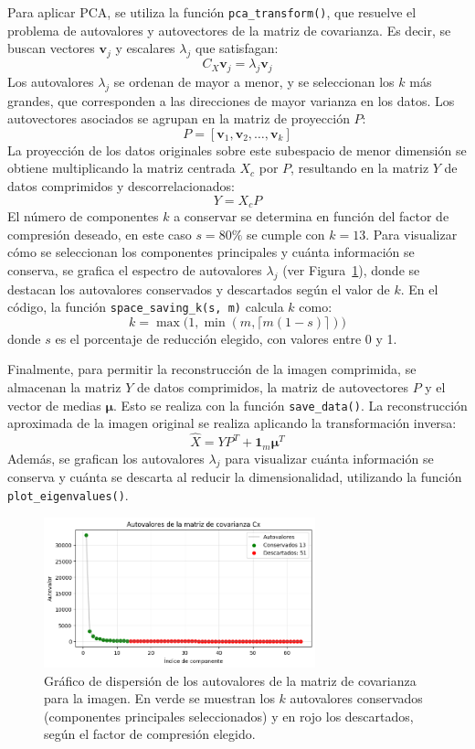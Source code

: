 \documentclass[a4paper,12pt]{article}
\begin{document}
Para aplicar PCA, se utiliza la función \texttt{pca\_transform()}, que resuelve el problema de autovalores y autovectores de la matriz de covarianza. Es decir, se buscan vectores $\mathbf{v}_j$ y escalares $\lambda_j$ que satisfagan:
\[
C_X \mathbf{v}_j = \lambda_j \mathbf{v}_j
\]
Los autovalores $\lambda_j$ se ordenan de mayor a menor, y se seleccionan los $k$ más grandes, que corresponden a las direcciones de mayor varianza en los datos. Los autovectores asociados se agrupan en la matriz de proyección $P$:
\[
P = [\mathbf{v}_1, \mathbf{v}_2, \ldots, \mathbf{v}_k]
\]
La proyección de los datos originales sobre este subespacio de menor dimensión se obtiene multiplicando la matriz centrada $X_c$ por $P$, resultando en la matriz $Y$ de datos comprimidos y descorrelacionados:
\[
Y = X_c P
\]
El número de componentes $k$ a conservar se determina en función del factor de compresión deseado, en este caso $s = 80\%$ se cumple con $k = 13$. Para visualizar cómo se seleccionan los componentes principales y cuánta información se conserva, se grafica el espectro de autovalores $\lambda_j$ (ver Figura~\ref{fig:eigvals2}), donde se destacan los autovalores conservados y descartados según el valor de $k$. En el código, la función \texttt{space\_saving\_k(s, m)} calcula $k$ como:
\[
k = \max\big(1, \min(m, \lceil m(1-s) \rceil)\big)
\]
donde $s$ es el porcentaje de reducción elegido, con valores entre 0 y 1.

\vspace{1em}

Finalmente, para permitir la reconstrucción de la imagen comprimida, se almacenan la matriz $Y$ de datos comprimidos, la matriz de autovectores $P$ y el vector de medias $\boldsymbol{\mu}$. Esto se realiza con la función \texttt{save\_data()}. La reconstrucción aproximada de la imagen original se realiza aplicando la transformación inversa:
\[
\hat{X} = Y P^T + \mathbf{1}_m \boldsymbol{\mu}^T
\]
Además, se grafican los autovalores $\lambda_j$ para visualizar cuánta información se conserva y cuánta se descarta al reducir la dimensionalidad, utilizando la función \texttt{plot\_eigenvalues()}.


\begin{figure}[H]
    \centering
    \includegraphics[width=0.7\textwidth]{Ejercicio2.png}
    \caption{Gráfico de dispersión de los autovalores de la matriz de covarianza para la imagen. En verde se muestran los $k$ autovalores conservados (componentes principales seleccionados) y en rojo los descartados, según el factor de compresión elegido.}
    \label{fig:eigvals2}
\end{figure}
\end{document}
